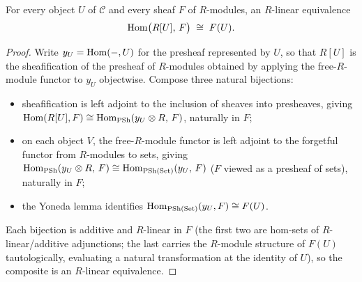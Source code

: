 \begin{definition}
  \label{pa-def:freeModuleSheafHomEquiv}
  \leanok

  For every object \(U\) of \(\mathcal C\) and every sheaf \(F\) of \(R\)-modules, an
  \(R\)-linear equivalence
  \[
    \operatorname{Hom}\bigl(R[U],\, F\bigr) \;\cong\; F(U).
  \]
\end{definition}
\begin{proof}
  \leanok
  Write \(y_U = \operatorname{Hom}(-,U)\) for the presheaf represented by \(U\), so that \(R[U]\) is the
  sheafification of the presheaf of \(R\)-modules obtained by applying the free-\(R\)-module
  functor to \(y_U\) objectwise. Compose three natural bijections:
  \begin{itemize}
    \item sheafification is left adjoint to the inclusion of sheaves into presheaves, giving
      \(\operatorname{Hom}(R[U],F) \cong \operatorname{Hom}_{\mathrm{PSh}}(y_U \otimes R,\, F)\), naturally in \(F\);
    \item on each object \(V\), the free-\(R\)-module functor is left adjoint to the
      forgetful functor from \(R\)-modules to sets, giving
      \(\operatorname{Hom}_{\mathrm{PSh}}(y_U \otimes R,\, F) \cong \operatorname{Hom}_{\mathrm{PSh}(\mathrm{Set})}(y_U,\, F)\)
      (\(F\) viewed as a presheaf of sets), naturally in \(F\);
    \item the Yoneda lemma identifies \(\operatorname{Hom}_{\mathrm{PSh}(\mathrm{Set})}(y_U, F) \cong F(U)\).
  \end{itemize}
  Each bijection is additive and \(R\)-linear in \(F\) (the first two are hom-sets of
  \(R\)-linear/additive adjunctions; the last carries the \(R\)-module structure of \(F(U)\)
  tautologically, evaluating a natural transformation at the identity of \(U\)), so the
  composite is an \(R\)-linear equivalence.
\end{proof}

